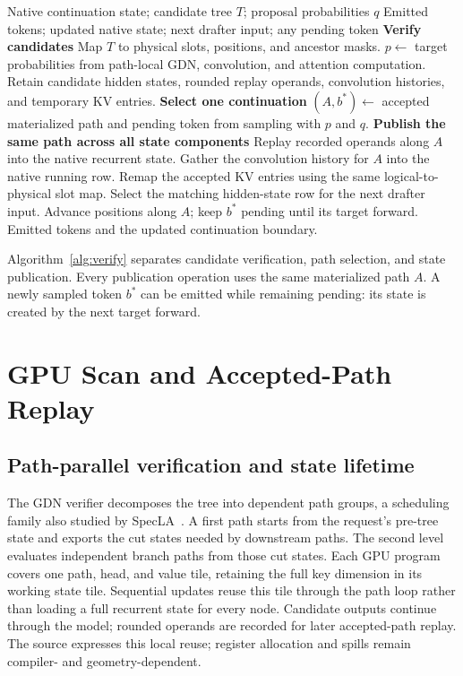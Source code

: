 \documentclass[conference]{IEEEtran}
\begin{document}
\begin{algorithm*}[t]
\caption{Tree verification and native continuation}
\label{alg:verify}
\normalsize\linespread{1.08}\selectfont\raggedright
\begin{algorithmic}[1]
\Require Native continuation state; candidate tree $T$; proposal probabilities $q$
\Ensure Emitted tokens; updated native state; next drafter input; any pending token
\Statex \textbf{Verify candidates}
\State Map $T$ to physical slots, positions, and ancestor masks.
\State $p\gets$ target probabilities from path-local GDN, convolution, and attention computation.
\State Retain candidate hidden states, rounded replay operands, convolution histories, and temporary KV entries.
\Statex \textbf{Select one continuation}
\State $(A,b^*)\gets$ accepted materialized path and pending token from sampling with $p$ and $q$.
\Statex \textbf{Publish the same path across all state components}
  \State Replay recorded operands along $A$ into the native recurrent state.
  \State Gather the convolution history for $A$ into the native running row.
\EndFor
\State Remap the accepted KV entries using the same logical-to-physical slot map.
\State Select the matching hidden-state row for the next drafter input.
\State Advance positions along $A$; keep $b^*$ pending until its target forward.
\State \Return Emitted tokens and the updated continuation boundary.
\end{algorithmic}
\end{algorithm*}

Algorithm~\ref{alg:verify} separates candidate verification, path selection, and state publication. Every publication operation uses the same materialized path $A$. A newly sampled token $b^*$ can be emitted while remaining pending: its state is created by the next target forward.

\section{GPU Scan and Accepted-Path Replay}
\label{sec:kernel}
\subsection{Path-parallel verification and state lifetime}
The GDN verifier decomposes the tree into dependent path groups, a scheduling family also studied by SpecLA~\cite{wang2026specla}. A first path starts from the request's pre-tree state and exports the cut states needed by downstream paths. The second level evaluates independent branch paths from those cut states. Each GPU program covers one path, head, and value tile, retaining the full key dimension in its working state tile. Sequential updates reuse this tile through the path loop rather than loading a full recurrent state for every node. Candidate outputs continue through the model; rounded operands are recorded for later accepted-path replay. The source expresses this local reuse; register allocation and spills remain compiler- and geometry-dependent.
\end{document}
